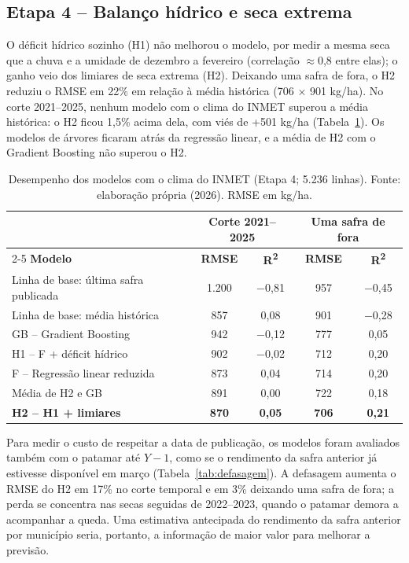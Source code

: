 \documentclass[12pt]{article}
\begin{document}
\subsection{Etapa 4 -- Balanço hídrico e seca extrema}

O déficit hídrico sozinho (H1) não melhorou o modelo, por medir a mesma
seca que a chuva e a umidade de dezembro a fevereiro (correlação
$\approx$0,8 entre elas); o ganho veio dos limiares de seca extrema (H2).
Deixando uma safra de fora, o H2 reduziu o RMSE em 22\% em relação à
média histórica (706 $\times$ 901 kg/ha). No corte 2021--2025, nenhum
modelo com o clima do INMET superou a média histórica: o H2 ficou 1,5\%
acima dela, com viés de +501 kg/ha (Tabela~\ref{tab:resultados}). Os
modelos de árvores ficaram atrás da regressão linear, e a média de H2 com
o Gradient Boosting não superou o H2.

\begin{table}[ht]
\centering
\caption{Desempenho dos modelos com o clima do INMET (Etapa 4; 5.236
  linhas). Fonte: elaboração própria (2026). RMSE em kg/ha.}
\label{tab:resultados}
\begin{tabular}{|p{5.4cm}|c|c|c|c|}
\hline
 & \multicolumn{2}{c|}{\textbf{Corte 2021--2025}} &
   \multicolumn{2}{c|}{\textbf{Uma safra de fora}} \\ \cline{2-5}
\textbf{Modelo} & \textbf{RMSE} & \textbf{R\textsuperscript{2}} &
  \textbf{RMSE} & \textbf{R\textsuperscript{2}} \\ \hline
Linha de base: última safra publicada & 1.200 & $-$0,81 & 957 & $-$0,45 \\ \hline
Linha de base: média histórica & 857 & 0,08 & 901 & $-$0,28 \\ \hline
GB -- Gradient Boosting & 942 & $-$0,12 & 777 & 0,05 \\ \hline
H1 -- F + déficit hídrico & 902 & $-$0,02 & 712 & 0,20 \\ \hline
F -- Regressão linear reduzida & 873 & 0,04 & 714 & 0,20 \\ \hline
Média de H2 e GB & 891 & 0,00 & 722 & 0,18 \\ \hline
\textbf{H2 -- H1 + limiares} & \textbf{870} & \textbf{0,05} &
  \textbf{706} & \textbf{0,21} \\ \hline
\end{tabular}
\end{table}

Para medir o custo de respeitar a data de publicação, os modelos foram
avaliados também com o patamar até $Y-1$, como se o rendimento da safra
anterior já estivesse disponível em março (Tabela~\ref{tab:defasagem}). A
defasagem aumenta o RMSE do H2 em 17\% no corte temporal e em 3\%
deixando uma safra de fora; a perda se concentra nas secas seguidas de
2022--2023, quando o patamar demora a acompanhar a queda. Uma estimativa
antecipada do rendimento da safra anterior por município seria, portanto,
a informação de maior valor para melhorar a previsão.
\end{document}
